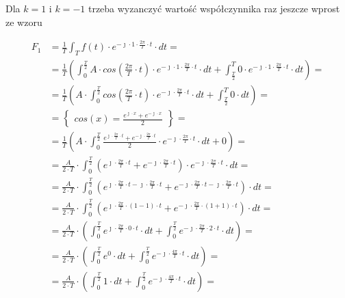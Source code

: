 \begin{task}
Dla $k=1$ i $k=-1$ trzeba wyzanczyć wartość współczynnika raz jeszcze wprost ze wzoru

\begin{align*}
F_1&=\frac{1}{T}\int_{T}f(t) \cdot e^{-\jmath \cdot 1 \cdot \frac{2\pi}{T} \cdot t} \cdot dt=\\
&=\frac{1}{T}\left( \int_{0}^{\frac{T}{2}}A \cdot cos\left( \frac{2\pi}{T} \cdot t\right) \cdot e^{ - \jmath \cdot 1 \cdot \frac{2\pi}{T} \cdot t} \cdot dt + \int_{\frac{T}{2}}^{T} 0 \cdot e^{ - \jmath \cdot 1 \cdot \frac{2\pi}{T} \cdot t} \cdot dt\right)=\\
&=\frac{1}{T}\left( A \cdot  \int_{0}^{\frac{T}{2}}cos\left( \frac{2\pi}{T} \cdot t\right) \cdot e^{ -\jmath \cdot \frac{2\pi}{T} \cdot t} \cdot dt + \int_{\frac{T}{2}}^{T} 0 \cdot dt\right)=\\
&=\begin{Bmatrix}
cos\left(x\right) = \frac{e^{\jmath \cdot x}+e^{-\jmath \cdot x}}{2}
\end{Bmatrix}=\\
&=\frac{1}{T}\left( A \cdot  \int_{0}^{\frac{T}{2}} \frac{e^{\jmath \cdot \frac{2\pi}{T} \cdot t}+e^{-\jmath \cdot \frac{2\pi}{T} \cdot t}}{2} \cdot e^{ - \jmath \cdot \frac{2\pi}{T} \cdot t} \cdot dt + 0\right)=\\
&=\frac{A}{2\cdot T}\cdot  \int_{0}^{\frac{T}{2}} \left(e^{\jmath \cdot \frac{2\pi}{T} \cdot t}+e^{-\jmath \cdot \frac{2\pi}{T} \cdot t}\right) \cdot e^{- \jmath \cdot \frac{2\pi}{T} \cdot t} \cdot dt =\\
&=\frac{A}{2\cdot T}\cdot  \int_{0}^{\frac{T}{2}} \left(e^{\jmath \cdot \frac{2\pi}{T} \cdot t - \jmath \cdot \frac{2\pi}{T} \cdot t}+e^{-\jmath \cdot \frac{2\pi}{T} \cdot t - \jmath \cdot \frac{2\pi}{T} \cdot t}\right) \cdot dt =\\
&=\frac{A}{2\cdot T}\cdot  \int_{0}^{\frac{T}{2}} \left(e^{\jmath \cdot \frac{2\pi}{T} \cdot \left(1 -1\right) \cdot t}+e^{-\jmath \cdot \frac{2\pi}{T} \cdot \left(1+1\right)\cdot t }\right) \cdot dt =\\
&=\frac{A}{2\cdot T}\cdot \left( \int_{0}^{\frac{T}{2}} e^{\jmath \cdot \frac{2\pi}{T} \cdot 0 \cdot t} \cdot dt + \int_{0}^{\frac{T}{2}} e^{-\jmath \cdot \frac{2\pi}{T} \cdot 2 \cdot t } \cdot dt \right)=\\
&=\frac{A}{2\cdot T}\cdot \left( \int_{0}^{\frac{T}{2}} e^{0} \cdot dt + \int_{0}^{\frac{T}{2}} e^{-\jmath \cdot \frac{4\pi}{T} \cdot t } \cdot dt \right)=\\
&=\frac{A}{2\cdot T}\cdot \left( \int_{0}^{\frac{T}{2}} 1 \cdot dt + \int_{0}^{\frac{T}{2}} e^{-\jmath \cdot \frac{4\pi}{T} \cdot t } \cdot dt \right)=\\

\end{align*}
\end{task}
